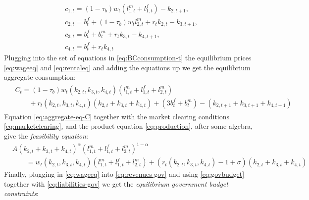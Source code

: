 \documentclass[BufferStockTheory]{subfiles}
\begin{document}
\begin{equation}
	\label{eq:BCconsumption-t}
	\begin{aligned}
	&c_{1,t}   = (1-\tau_b)w_t (l_{1,t}^m +l_{1,t}^f) -k_{2,t+1} ,\\
 	&c_{2,t}   = b_{t}^f+(1-\tau_b)w_{t} l_{2,t}^m  + r_{t}k_{2,t} -k_{3,t+1}  ,\\
 	&c_{3,t}   = b_{t}^f+ b_{t}^m  + r_{t}k_{3,t} -k_{4,t+1}  ,\\
 	&c_{4,t}  = b_{t}^f + r_{t}k_{4,t}
\end{aligned}
\end{equation}
Plugging into the set of equations in \eqref{eq:BCconsumption-t} the equilibrium prices \eqref{eq:wageeq} and \eqref{eq:rentaleq} and adding the equations up we get the equilibrium aggregate consumption:
\begin{equation}
	\label{eq:aggregate-eq-C}
	\begin{gathered}
	\begin{aligned}
			&C_t= (1-\tau_b)w_t(k_{2,t},k_{3,t},k_{4,t})(l_{1,t}^m +l_{1,t}^f + l_{2,t}^m )\\
                &\qquad + r_t(k_{2,t}, k_{3,t}, k_{4,t})(k_{2,t}+k_{3,t}+k_{4,t})  + (3b_{t}^f + b_{t}^m )
			 -(k_{2,t+1} +k_{3,t+1} +k_{4,t+1} )
			 \end{aligned}
	\end{gathered}
\end{equation}
Equation \eqref{eq:aggregate-eq-C} together with the market clearing conditions \eqref{eq:marketclearing}, and the product equation \eqref{eq:production}, after some algebra, give the 
\emph{feasibility equation}:
\begin{equation}
	\label{eq:dyn-eq-feasibility}
	\begin{aligned}
	&A(k_{2,t}+k_{3,t}+k_{4,t})^\alpha (l_{1,t}^m +l_{1,t}^f + l_{2,t}^m)^{1-\alpha}\\
	&\qquad=w_t(k_{2,t},k_{3,t},k_{4,t})(l_{1,t}^m +l_{1,t}^f + l_{2,t}^m) + (r_t(k_{2,t}, k_{3,t}, k_{4,t})-1+\sigma) (k_{2,t}+k_{3,t}+k_{4,t})
	\end{aligned}
\end{equation}
Finally, plugging in \eqref{eq:wageeq} into \eqref{eq:revenues-gov} and using \eqref{eq:govbudget} together with  \eqref{eq:liabilities-gov} we get the \emph{equilibrium government budget constraints}:
\end{document}

